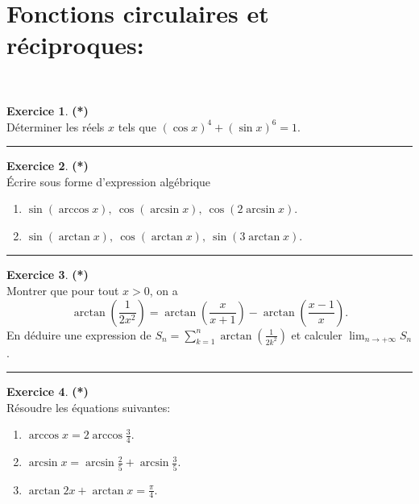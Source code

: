 \documentclass[a4paper,11pt]{article}
\theoremstyle{definition}
\newtheorem{exo}{Exercice} %
\begin{document}
\section*{Fonctions circulaires et réciproques:}\hfill\\%
\begin{minipage}{1\linewidth}
	\begin{minipage}[t]{0.48\linewidth}
		\raggedright
		
			\begin{exo}\textbf{(*)}\quad\\[0.2cm]
			Déterminer les réels $x$ tels que $(\cos x)^4 + (\sin x)^6 = 1$.
			\centering
			\rule{1\linewidth}{0.6pt}
		\end{exo}
	
		
		\begin{exo}\textbf{(*)}\quad\\[0.2cm]
			\'Ecrire sous forme d'expression algébrique
			\begin{enumerate}
				\item $ \sin(\arccos x),\ \cos(\arcsin x),\ \cos(2 \arcsin x)$.
				\item $ \sin(\arctan x),\ \cos(\arctan x),\ \sin(3 \arctan x)$.
			\end{enumerate}
			
			\centering
			\rule{1\linewidth}{0.6pt}
		\end{exo}
		
		\begin{exo}\textbf{(*)}\quad\\[0.2cm]
			Montrer que pour tout $x>0$, on a
			$$\arctan\left(\frac{1}{2x^2}\right)=\arctan\left(\frac{x}{x+1}\right)-\arctan\left(\frac{x-1}{x}\right).$$
			En déduire une expression de $\displaystyle S_n=\sum_{k=1}^n\arctan\left(\frac{1}{2k^2}\right)$ 
			et calculer $\displaystyle\lim_{n\to +\infty}S_n$.
			
			\centering
			\rule{1\linewidth}{0.6pt}
		\end{exo}
		
	\end{minipage}	
	\hfill\vrule\hfill
	\begin{minipage}[t]{0.48\linewidth}
		\raggedright
		
			\begin{exo}\textbf{(*)}\quad\\[0.2cm]
			Résoudre les équations suivantes:
			\begin{enumerate}
				\item $\arccos x = 2\arccos \frac{3}{4}$.
				\item $\arcsin x = \arcsin \frac{2}{5} + \arcsin \frac{3}{5}$.
				\item $\arctan {2x}+\arctan x=\frac{\pi}{4}$.
			\end{enumerate}
			

\end{exo}
\end{minipage}
\end{minipage}
\end{document}
